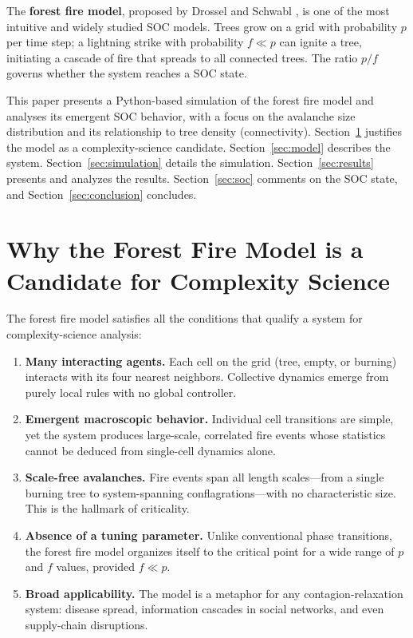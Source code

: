 \documentclass[12pt, a4paper]{article}
\begin{document}
The \textbf{forest fire model}, proposed by Drossel and Schwabl \cite{drossel1992self},
is one of the most intuitive and widely studied SOC models. Trees grow on a grid with
probability $p$ per time step; a lightning strike with probability $f \ll p$ can
ignite a tree, initiating a cascade of fire that spreads to all connected trees. The
ratio $p/f$ governs whether the system reaches a SOC state.

This paper presents a Python-based simulation of the forest fire model and analyses
its emergent SOC behavior, with a focus on the avalanche size distribution and its
relationship to tree density (connectivity). Section~\ref{sec:why_complex} justifies
the model as a complexity-science candidate. Section~\ref{sec:model} describes the
system. Section~\ref{sec:simulation} details the simulation. Section~\ref{sec:results}
presents and analyzes the results. Section~\ref{sec:soc} comments on the SOC state,
and Section~\ref{sec:conclusion} concludes.

\section{Why the Forest Fire Model is a Candidate for Complexity Science}
\label{sec:why_complex}

The forest fire model satisfies all the conditions that qualify a system for
complexity-science analysis:

\begin{enumerate}
    \item \textbf{Many interacting agents.} Each cell on the grid (tree, empty, or
    burning) interacts with its four nearest neighbors. Collective dynamics emerge
    from purely local rules with no global controller.

    \item \textbf{Emergent macroscopic behavior.} Individual cell transitions are
    simple, yet the system produces large-scale, correlated fire events whose
    statistics cannot be deduced from single-cell dynamics alone.

    \item \textbf{Scale-free avalanches.} Fire events span all length scales—from a
    single burning tree to system-spanning conflagrations—with no characteristic
    size. This is the hallmark of criticality.

    \item \textbf{Absence of a tuning parameter.} Unlike conventional phase
    transitions, the forest fire model organizes itself to the critical point for a
    wide range of $p$ and $f$ values, provided $f \ll p$.

    \item \textbf{Broad applicability.} The model is a metaphor for any
    contagion-relaxation system: disease spread, information cascades in social
    networks, and even supply-chain disruptions.
\end{enumerate}
\end{document}
